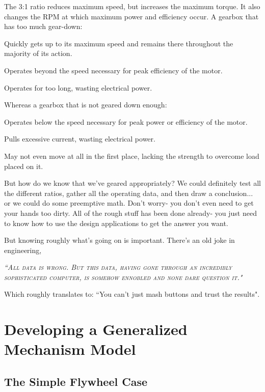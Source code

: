 The 3:1 ratio reduces maximum speed, but increases the maximum torque. It also changes the RPM at which maximum power and efficiency occur. A gearbox that has too much gear-down:
\begin{asparaitem}
	\item Quickly gets up to its maximum speed and remains there throughout the majority of its action.
	\item Operates beyond the speed necessary for peak efficiency of the motor.
	\item Operates for too long, wasting electrical power.
\end{asparaitem}

Whereas a gearbox that is not geared down enough:
\begin{asparaitem}
	\item Operates below the speed necessary for peak power or efficiency of the motor.
	\item Pulls excessive current, wasting electrical power.
	\item May not even move at all in the first place, lacking the strength to overcome load placed on it.
\end{asparaitem}

But how do we know that we've geared appropriately? We could definitely test all the different ratios, gather all the operating data, and then draw a conclusion... or we could do some preemptive math. Don't worry- you don't even need to get your hands too dirty. All of the rough stuff has been done already- you just need to know how to use the design applications to get the answer you want.

But knowing roughly what's going on is important. There's an old joke in engineering,

 {\slshape \scshape ``All data is wrong. But this data, having gone through an incredibly sophisticated computer, is somehow ennobled and none dare question it."}
 
 Which roughly translates to: ``You can't just mash buttons and trust the results".

\section{Developing a Generalized Mechanism Model}

\subsection{The Simple Flywheel Case}

